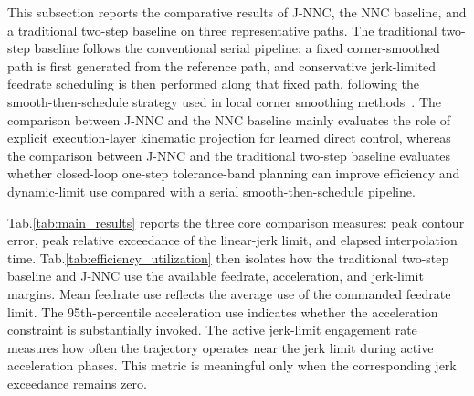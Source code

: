 \documentclass[preprint,12pt]{elsarticle}
\newcommand{\tabref}[1]{Tab.\nobreakspace\ref{#1}}
\begin{document}
This subsection reports the comparative results of J-NNC, the NNC baseline, and a traditional two-step baseline on three representative paths. The traditional two-step baseline follows the conventional serial pipeline: a fixed corner-smoothed path is first generated from the reference path, and conservative jerk-limited feedrate scheduling is then performed along that fixed path, following the smooth-then-schedule strategy used in local corner smoothing methods~\cite{Sencer2014}. The comparison between J-NNC and the NNC baseline mainly evaluates the role of explicit execution-layer kinematic projection for learned direct control, whereas the comparison between J-NNC and the traditional two-step baseline evaluates whether closed-loop one-step tolerance-band planning can improve efficiency and dynamic-limit use compared with a serial smooth-then-schedule pipeline.



\tabref{tab:main_results} reports the three core comparison measures: peak contour error, peak relative exceedance of the linear-jerk limit, and elapsed interpolation time. \tabref{tab:efficiency_utilization} then isolates how the traditional two-step baseline and J-NNC use the available feedrate, acceleration, and jerk-limit margins. Mean feedrate use reflects the average use of the commanded feedrate limit. The 95th-percentile acceleration use indicates whether the acceleration constraint is substantially invoked. The active jerk-limit engagement rate measures how often the trajectory operates near the jerk limit during active acceleration phases. This metric is meaningful only when the corresponding jerk exceedance remains zero.
\end{document}
